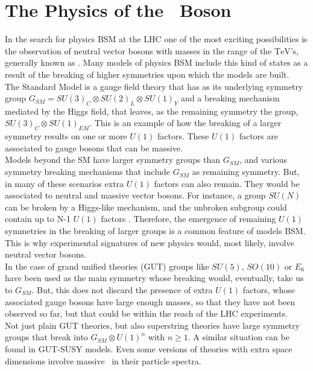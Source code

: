 \chapter[The Physics of The \Zprime~Boson]{The Physics of the \Zprime~Boson}
\label{chap:Zp}

\noindent In the search for physics BSM at the LHC one of the most exciting possibilities 
is the observation of neutral vector bosons with masses in the range of 
the $\textrm{TeV}$'s, generally known as \Zprime. Many models of physics 
BSM include this kind of states as a result of the breaking of higher symmetries upon 
which the models are built. \\

\noindent The Standard Model is a gauge field theory that has as its underlying symmetry 
group $G_{SM} = SU(3)_{C}\otimes SU(2)_{L} \otimes SU(1)_{Y}$ and a breaking mechanism 
mediated by the Higgs field, that leaves, as the remaining symmetry the group,
$SU(3)_{C}\otimes SU(1)_{EM}$. This is an example of how the breaking of a larger symmetry 
results on one or more $U(1)$ factors. These $U(1)$ factors are associated to gauge
bosons that can be massive.\\

\noindent Models beyond the SM have larger symmetry groups than $G_{SM}$, and various symmetry breaking 
mechanisms that include $G_{SM}$ as remaining symmetry. But, in many of these 
scenarios extra $U(1)$ factors can also remain. They would be associated 
to neutral and massive vector bosons. For instance, a group $SU(N)$ can 
be broken by a Higgs-like mechanism, and the unbroken subgroup could contain up to
N-1 $U(1)$ factors \cite{Langacker:2008yv}. Therefore, the emergence of remaining 
$U(1)$ symmetries in the breaking of larger groups is a common feature 
of models BSM. This is why experimental signatures of new physics 
would, most likely, involve neutral vector bosons.\\
% 
\noindent In the case of grand unified theories (GUT) groups like $SU(5)$, $SO(10)$ or $E_{6}$ have been
used as the main symmetry whose breaking would, eventually, take us to $G_{SM}$. But, this
does not discard the presence of extra $U(1)$ factors, whose associated 
gauge bosons have large enough masses, so that they have not 
been observed so far, but that could be within the reach of the LHC 
experiments. \\

\noindent Not just plain GUT theories, but also superstring theories have large symmetry groups 
that break into $G_{SM} \otimes U(1)^{n}$ with $n \geq 1$. A similar situation can be found in 
GUT-SUSY models. Even some versions of theories with extra space dimensions involve
massive \Zprime~in their particle spectra. \\

